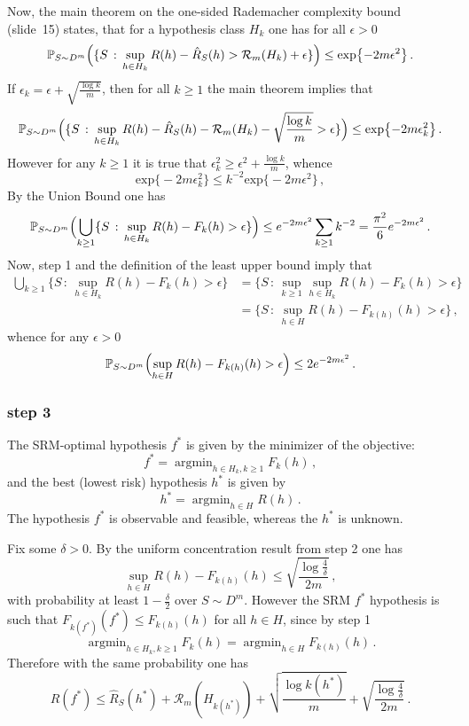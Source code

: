 \documentclass[a4paper]{article}
\newcommand{\pr}{\mathbb{P}}
\newcommand{\argmin}{\mathop{\text{argmin}}}
\begin{document}
Now, the main theorem on the one-sided Rademacher complexity bound (slide~15) states,
that for a hypothesis class $H_k$ one has for all $\epsilon>0$
\[ \pr_{S\sim D^m}\Bigl( \{S\,:\,
    \sup_{h\in H_k} R(h) - \hat{R}_S(h) > \mathcal{R}_m(H_k) + \epsilon\}
  \Bigr) \leq \text{exp}\bigl\{-2m\epsilon^2\bigr\}
  \,. \]
If $\epsilon_k = \epsilon + \sqrt{\frac{\log k}{m}}$, then for all $k\geq 1$ the main
theorem implies that
\[ \pr_{S\sim D^m}\Bigl( \{S\,:\,
    \sup_{h\in H_k} R(h) - \hat{R}_S(h) - \mathcal{R}_m(H_k) - \sqrt{\frac{\log k}{m}} > \epsilon\}
  \Bigr) \leq \text{exp}\bigl\{-2m\epsilon_k^2\bigr\}
  \,. \]
However for any $k\geq 1$ it is true that $\epsilon_k^2 \geq \epsilon^2 + \frac{\log k}{m}$,
whence
\[ \text{exp}\bigl\{-2m\epsilon_k^2\bigr\}
  \leq k^{-2} \text{exp}\bigl\{-2m\epsilon^2\bigr\}
  \,,\]
By the Union Bound one has
\[ \pr_{S\sim D^m}\Bigl(
  \bigcup_{k\geq 1} \{S\,:\, \sup_{h\in H_k} R(h) - F_k(h) > \epsilon\}
  \Bigr) \leq e^{-2m\epsilon^2} \sum_{k\geq 1} k^{-2}
  = \frac{\pi^2}{6} e^{-2m\epsilon^2}
  \,. \]
Now, step 1 and the definition of the least upper bound imply that
\begin{align*}
  \bigcup_{k\geq 1} \{S\,:\, \sup_{h\in H_k} R(h) - F_k(h) > \epsilon\}
    &= \{S\,:\, \sup_{k\geq 1} \sup_{h\in H_k} R(h) - F_k(h) > \epsilon\}\\
    &= \{S\,:\, \sup_{h\in H} R(h) - F_{k(h)}(h) > \epsilon\} \,,
\end{align*}
whence for any $\epsilon>0$
\[ \pr_{S\sim D^m}\Bigl(
  \sup_{h\in H} R(h) - F_{k(h)}(h) > \epsilon
  \Bigr) \leq 2 e^{-2m\epsilon^2}
  \,. \]


\subsubsection*{step 3} %
\label{ssub:step_3}

The SRM-optimal hypothesis $f^*$ is given by the minimizer of the objective:
\[ f^* = \argmin_{h\in H_k, k\geq1} F_k(h) \,, \]
and the best (lowest risk) hypothesis $h^*$ is given by
\[ h^* = \argmin_{h\in H} R(h) \,. \]
The hypothesis $f^*$ is observable and feasible, whereas the $h^*$ is unknown.

\noindent Fix some $\delta>0$. By the uniform concentration result from step 2 one
has
\[ \sup_{h\in H} R(h) - F_{k(h)}(h) \leq \sqrt{\frac{\log\frac{4}{\delta}}{2m}}
  \,,\]
with probability at least $1-\frac{\delta}{2}$ over $S\sim D^m$. However the SRM
$f^*$ hypothesis is such that $F_{k(f^*)}(f^*) \leq F_{k(h)}(h)$ for all $h\in H$,
since by step 1
\[\argmin_{h\in H_k, k\geq1} F_k(h) = \argmin_{h\in H} F_{k(h)}(h) \,. \]
Therefore with the same probability one has
\[ R(f^*) \leq \hat{R}_S(h^*) + \mathcal{R}_m(H_{k(h^*)})
        + \sqrt{\frac{\log k(h^*)}{m}} + \sqrt{\frac{\log\frac{4}{\delta}}{2m}}
  \,. \]
\end{document}
